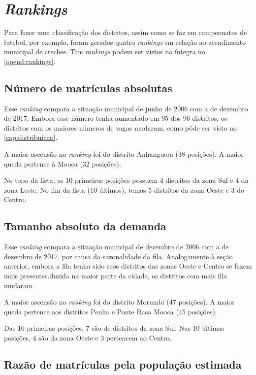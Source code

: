 \chapter{\textit{Rankings}}
\label{cap:rankings}

Para fazer uma classificação dos distritos, assim como se faz em campeonatos de futebol, por exemplo, foram gerados quatro \textit{rankings} em relação ao atendimento municipal de creches. Tais \textit{rankings} podem ser vistos na íntegra no \autoref{apend:rankings}.

\section{Número de matrículas absolutas}

Esse \textit{ranking} compara a situação municipal de junho de 2006 com a de dezembro de 2017. Embora esse número tenha aumentado em 95 dos 96 distritos, os distritos com os maiores números de vagas mudaram, como pôde ser visto no \autoref{cap:distribuicao}.

A maior ascensão no \textit{ranking} foi do distrito Anhanguera (38 posições). A maior queda pertence à Mooca (32 posições).

No topo da lista, as 10 primeiras posições possuem 4 distritos da zona Sul e 4 da zona Leste. No fim da lista (10 últimos), temos 5 distritos da zona Oeste e 3 do Centro.

\section{Tamanho absoluto da demanda}

Esse \textit{ranking} compara a situação municipal de dezembro de 2006 com a de dezembro de 2017, por causa da sazonalidade da fila. Analogamente à seção anterior, embora a fila tenha sido reos distritos das zonas Oeste e Centro se fazem mais presentes.duzida na maior parte da cidade, os distritos com mais fila mudaram.

A maior ascensão no \textit{ranking} foi do distrito Morumbi (47 posições). A maior queda pertence aos distritos Penha e Ponte Rasa Mooca (45 posições).

Das 10 primeiras posições, 7 são de distritos da zona Sul. Nas 10 últimas posições, 4 são da zona Oeste e 3 pertencem ao Centro.

\section{Razão de matrículas pela população estimada}

